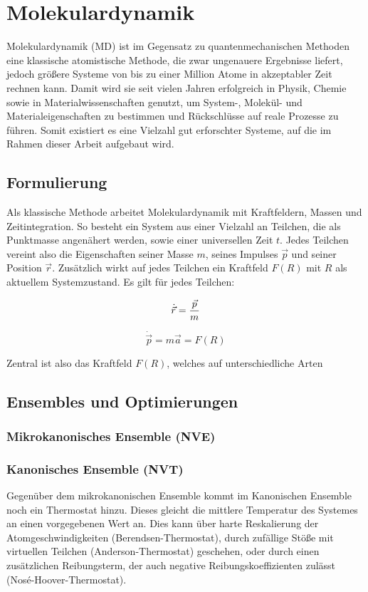 \section{Molekulardynamik}

Molekulardynamik (MD) ist im Gegensatz zu quantenmechanischen Methoden eine klassische atomistische Methode, die zwar ungenauere Ergebnisse liefert, jedoch größere Systeme von bis zu einer Million Atome in akzeptabler Zeit rechnen kann.
Damit wird sie seit vielen Jahren erfolgreich in Physik, Chemie sowie in Materialwissenschaften genutzt, um System-, Molekül- und Materialeigenschaften zu bestimmen und Rückschlüsse auf reale Prozesse zu führen.
Somit existiert es eine Vielzahl gut erforschter Systeme, auf die im Rahmen dieser Arbeit aufgebaut wird.

\subsection{Formulierung}

Als klassische Methode arbeitet Molekulardynamik mit Kraftfeldern, Massen und Zeitintegration.
So besteht ein System aus einer Vielzahl an Teilchen, die als Punktmasse angenähert werden, sowie einer universellen Zeit $t$.
Jedes Teilchen vereint also die Eigenschaften seiner Masse $m$, seines Impulses $\vec p$ und seiner Position $\vec r$.
Zusätzlich wirkt auf jedes Teilchen ein Kraftfeld $F(R)$ mit $R$ als aktuellem Systemzustand.
Es gilt für jedes Teilchen:

$$
\dot{\vec r} = {\vec p \over m}
$$

$$
\dot{\vec p} = m \vec a = F(R)
$$

Zentral ist also das Kraftfeld $F(R)$, welches auf unterschiedliche Arten 

\subsection{Ensembles und Optimierungen}

\subsubsection{Mikrokanonisches Ensemble (NVE)}

\subsubsection{Kanonisches Ensemble (NVT)}

Gegenüber dem mikrokanonischen Ensemble kommt im Kanonischen Ensemble noch ein Thermostat hinzu.
Dieses gleicht die mittlere Temperatur des Systemes an einen vorgegebenen Wert an.
Dies kann über harte Reskalierung der Atomgeschwindigkeiten (Berendsen-Thermostat), durch zufällige Stöße mit virtuellen Teilchen (Anderson-Thermostat) geschehen, oder durch einen zusätzlichen Reibungsterm, der auch negative Reibungskoeffizienten zulässt (Nosé-Hoover-Thermostat).

